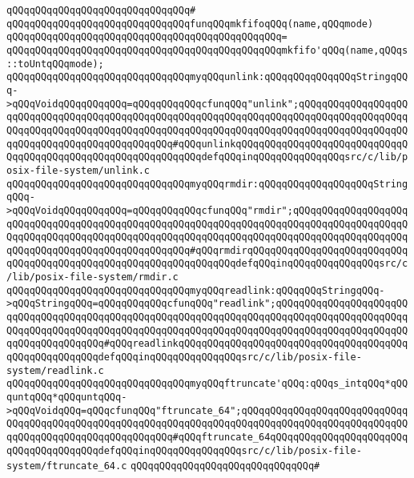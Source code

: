 \verb|qQQqqQQqqQQqqQQqqQQqqQQqqQQqqQQq#|\newline
\verb|qQQqqQQqqQQqqQQqqQQqqQQqqQQqqQQqfunqQQqmkfifoqQQq(name,qQQqmode)|\newline
\verb|qQQqqQQqqQQqqQQqqQQqqQQqqQQqqQQqqQQqqQQqqQQqqQQq=|\newline
\verb|qQQqqQQqqQQqqQQqqQQqqQQqqQQqqQQqqQQqqQQqqQQqqQQqmkfifo'qQQq(name,qQQqs::toUntqQQqmode);|\newline
\newline
\newline
\verb|qQQqqQQqqQQqqQQqqQQqqQQqqQQqqQQqmyqQQqunlink:qQQqqQQqqQQqqQQqStringqQQq->qQQqVoidqQQqqQQqqQQq=qQQqqQQqqQQqcfunqQQq"unlink";qQQqqQQqqQQqqQQqqQQqqQQqqQQqqQQqqQQqqQQqqQQqqQQqqQQqqQQqqQQqqQQqqQQqqQQqqQQqqQQqqQQqqQQqqQQqqQQqqQQqqQQqqQQqqQQqqQQqqQQqqQQqqQQqqQQqqQQqqQQqqQQqqQQqqQQqqQQqqQQqqQQqqQQqqQQqqQQqqQQqqQQqqQQq#qQQqunlinkqQQqqQQqqQQqqQQqqQQqqQQqqQQqqQQqqQQqqQQqqQQqqQQqqQQqqQQqqQQqqQQqdefqQQqinqQQqqQQqqQQqqQQqsrc/c/lib/posix-file-system/unlink.c|\newline
\verb|qQQqqQQqqQQqqQQqqQQqqQQqqQQqqQQqmyqQQqrmdir:qQQqqQQqqQQqqQQqqQQqStringqQQq->qQQqVoidqQQqqQQqqQQq=qQQqqQQqqQQqcfunqQQq"rmdir";qQQqqQQqqQQqqQQqqQQqqQQqqQQqqQQqqQQqqQQqqQQqqQQqqQQqqQQqqQQqqQQqqQQqqQQqqQQqqQQqqQQqqQQqqQQqqQQqqQQqqQQqqQQqqQQqqQQqqQQqqQQqqQQqqQQqqQQqqQQqqQQqqQQqqQQqqQQqqQQqqQQqqQQqqQQqqQQqqQQqqQQqqQQqqQQq#qQQqrmdirqQQqqQQqqQQqqQQqqQQqqQQqqQQqqQQqqQQqqQQqqQQqqQQqqQQqqQQqqQQqqQQqqQQqdefqQQqinqQQqqQQqqQQqqQQqsrc/c/lib/posix-file-system/rmdir.c|\newline
\verb|qQQqqQQqqQQqqQQqqQQqqQQqqQQqqQQqmyqQQqreadlink:qQQqqQQqStringqQQq->qQQqStringqQQq=qQQqqQQqqQQqcfunqQQq"readlink";qQQqqQQqqQQqqQQqqQQqqQQqqQQqqQQqqQQqqQQqqQQqqQQqqQQqqQQqqQQqqQQqqQQqqQQqqQQqqQQqqQQqqQQqqQQqqQQqqQQqqQQqqQQqqQQqqQQqqQQqqQQqqQQqqQQqqQQqqQQqqQQqqQQqqQQqqQQqqQQqqQQqqQQqqQQqqQQqqQQq#qQQqreadlinkqQQqqQQqqQQqqQQqqQQqqQQqqQQqqQQqqQQqqQQqqQQqqQQqqQQqqQQqdefqQQqinqQQqqQQqqQQqqQQqsrc/c/lib/posix-file-system/readlink.c|\newline
\newline
\verb|qQQqqQQqqQQqqQQqqQQqqQQqqQQqqQQqmyqQQqftruncate'qQQq:qQQqs_intqQQq*qQQquntqQQq*qQQquntqQQq->qQQqVoidqQQq=qQQqcfunqQQq"ftruncate_64";qQQqqQQqqQQqqQQqqQQqqQQqqQQqqQQqqQQqqQQqqQQqqQQqqQQqqQQqqQQqqQQqqQQqqQQqqQQqqQQqqQQqqQQqqQQqqQQqqQQqqQQqqQQqqQQqqQQqqQQqqQQqqQQq#qQQqftruncate_64qQQqqQQqqQQqqQQqqQQqqQQqqQQqqQQqqQQqqQQqdefqQQqinqQQqqQQqqQQqqQQqsrc/c/lib/posix-file-system/ftruncate_64.c|\newline
\verb|qQQqqQQqqQQqqQQqqQQqqQQqqQQqqQQq#|\newline

